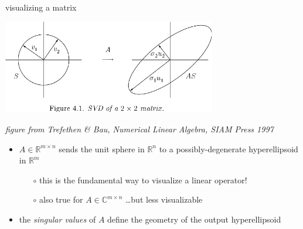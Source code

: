 \documentclass[10pt,hyperref]{beamer}
\newcommand{\CC}{\mathbb{C}}
\newcommand{\RR}{\mathbb{R}}
\begin{document}
\begin{frame}{visualizing a matrix}

\begin{center}
\includegraphics[width=0.7\textwidth]{figs/svd2d}
\end{center}

\vspace{-5mm}
\hfill \tiny \emph{figure from Trefethen \& Bau, \emph{Numerical Linear Algebra}, SIAM Press 1997} \normalsize

\bigskip
\begin{itemize}
\item $A \in \RR^{m\times n}$ sends the unit sphere in $\RR^n$ to a possibly-degenerate hyperellipsoid in $\RR^m$
    \begin{itemize}
    \item[$\circ$] this is \alert{the fundamental way to visualize a linear operator!}
    \item[$\circ$] also true for $A \in \CC^{m\times n}$ \dots but less visualizable
    \end{itemize}
\item the \emph{singular values} of $A$ define the geometry of the output hyperellipsoid
\end{itemize}
\end{frame}
\end{document}
